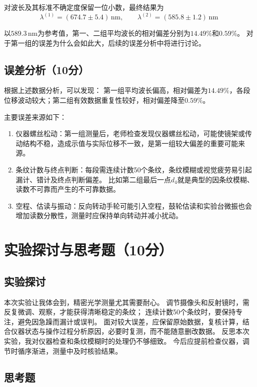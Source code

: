\documentclass[10pt,a4paper]{ctexart} %
\begin{document}
  对波长及其标准不确定度保留一位小数，最终结果为
  \[
    \boxed{\lambda^{(1)}=(674.7\pm5.4)\,\mathrm{nm}},\qquad
    \boxed{\lambda^{(2)}=(585.8\pm1.2)\,\mathrm{nm}}
  \]

  以$589.3\,\mathrm{nm}$为参考值，第一、二组平均波长的相对偏差分别为$14.49\%$和$0.59\%$。
  对于第一组的误差为什么会如此大，后续的误差分析中将进行讨论。

  \subsection{误差分析（10分）}
  根据上述数据分析，可以发现：
  第一组平均波长偏高，相对偏差为$14.49\%$，各段位移波动较大；第二组有效数据重复性较好，相对偏差降至$0.59\%$。
  
  主要误差来源如下：
  \begin{enumerate}
    \item 仪器螺丝松动：第一组测量后，老师检查发现仪器螺丝松动，可能使镜架或传动结构不稳，造成示值与实际位移不一致，是第一组较大偏差的重要可能来源。
    \item 条纹计数与终点判断：每段需连续计数50个条纹，条纹模糊或视觉疲劳易引起漏计、错计及终点判断偏差。
    比如第二组最后一点$d_4$就是典型的因条纹模糊、读数不可靠而产生的不可靠数据。
    \item 空程、估读与振动：反向转动手轮可能引入空程，鼓轮估读和实验台微振也会增加读数分散性，测量时应保持单向转动并减小扰动。
  \end{enumerate}

\section{实验探讨与思考题（10分）}

  \subsection{实验探讨}
  本次实验让我体会到，精密光学测量尤其需要耐心。
  调节摄像头和反射镜时，需反复微调、观察，才能获得清晰稳定的条纹；
  连续计数50个条纹时，要保持专注，避免因急躁而漏计或误判。
  面对较大误差，应保留原始数据，复核计算，结合仪器状态与操作过程分析原因，必要时复测，而不能随意删改数据。
  反思本次实验，我对仪器检查和条纹模糊时的处理仍不够细致。
  今后应提前检查仪器，调节时循序渐进，测量中及时核验结果。

  \subsection{思考题}
\end{document}
